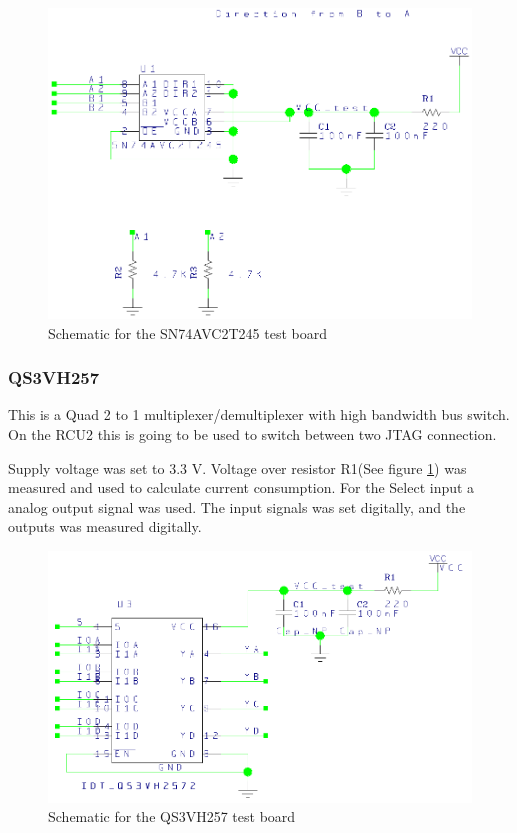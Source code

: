 \documentclass[12pt]{article}
\numberwithin{figure}{section}
\begin{document}
\begin{figure}[!htbp]
  \centering
  \includegraphics[width=\textwidth]{SN74AVC2T245_sch.png}
  \caption{Schematic for the SN74AVC2T245 test board}
  \label{SN74AVC2T245_sch}
\end{figure}
\FloatBarrier

\subsubsection{QS3VH257}
This is a Quad 2 to 1 multiplexer/demultiplexer with high bandwidth bus switch. On the \ac{RCU2} this is going to be used to switch between two \acf{JTAG} connection.

Supply voltage was set to 3.3 V. Voltage over resistor R1(See figure \ref{SN74AVC2T245_sch}) was measured and used to calculate current consumption.
For the Select input a analog output signal was used. The input signals was set digitally, and the outputs was measured digitally.

\begin{figure}[!htbp]
  \centering
  \includegraphics[width=\textwidth]{QS3VH257_sch.png}
  \caption{Schematic for the QS3VH257 test board}
  \label{QS3VH257_sch}
\end{figure}
\FloatBarrier
\end{document}
